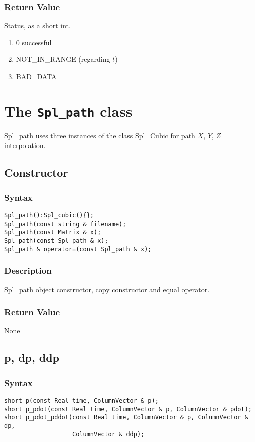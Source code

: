 \documentclass[11pt,fleqn,letterpaper]{report}
\begin{document}
\subsubsection*{Return Value}

Status, as a short int.
\begin{enumerate}
\item[] 0 successful
\item[] NOT\_IN\_RANGE (regarding $t$)
\item[] BAD\_DATA
\end{enumerate}


\newpage

\section{The \texttt{Spl\_path} class}

Spl\_path uses three instances of the class Spl\_Cubic for path $X$,
$Y$, $Z$ interpolation.

\subsection*{Constructor}
\subsubsection*{Syntax}
\begin{verbatim}
Spl_path():Spl_cubic(){};
Spl_path(const string & filename);
Spl_path(const Matrix & x);
Spl_path(const Spl_path & x);
Spl_path & operator=(const Spl_path & x);
\end{verbatim}

\subsubsection*{Description}   
Spl\_path object constructor, copy constructor and equal operator.

\subsubsection*{Return Value}

None

\newpage

\subsection*{p, dp, ddp}
\subsubsection*{Syntax}
\begin{verbatim}
short p(const Real time, ColumnVector & p);
short p_pdot(const Real time, ColumnVector & p, ColumnVector & pdot);
short p_pdot_pddot(const Real time, ColumnVector & p, ColumnVector & dp, 
                   ColumnVector & ddp);
\end{verbatim}
\end{document}
